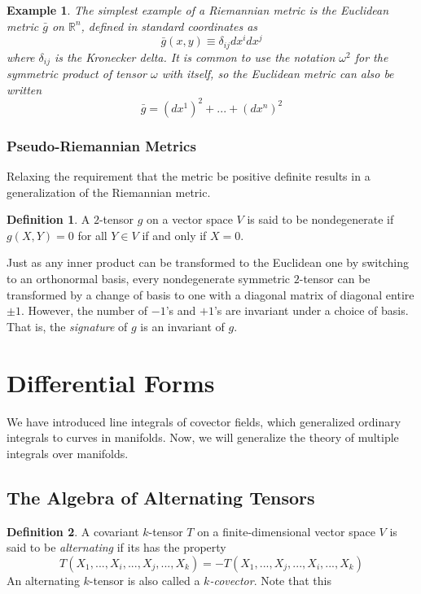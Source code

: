\documentclass{article}
\newtheorem{example}{Example}[section]
\theoremstyle{remark}
\theoremstyle{definition}
\newtheorem{definition}{Definition}[section]
\begin{document}
    \begin{example}
    The simplest example of a Riemannian metric is the \textit{Euclidean metric} $\bar{g}$ on $\mathbb{R}^n$, defined in standard coordinates as 
    \[\bar{g}(x, y) \equiv \delta_{ij} dx^i dx^j\]
    where $\delta_{ij}$ is the Kronecker delta. It is common to use the notation $\omega^2$ for the symmetric product of tensor $\omega$ with itself, so the Euclidean metric can also be written 
    \[\bar{g} = (dx^1)^2 + ... + (dx^n)^2\]
    \end{example}

    \subsubsection{Pseudo-Riemannian Metrics}
      Relaxing the requirement that the metric be positive definite results in a generalization of the Riemannian  metric. 

      \begin{definition}
      A $2$-tensor $g$ on a vector space $V$ is said to be nondegenerate if $g(X, Y) = 0$ for all $Y \in V$ if and only if $X = 0$. 
      \end{definition}

      Just as any inner product can be transformed to the Euclidean one by switching to an orthonormal basis, every nondegenerate  symmetric $2$-tensor can be transformed by a change of basis to one with a diagonal matrix of diagonal entire $\pm 1$. However, the number of $-1$'s and $+1$'s are invariant under a choice of basis. That is, the \textit{signature} of $g$ is an invariant of $g$. 

\section{Differential Forms}

  We have introduced line integrals of covector fields, which generalized ordinary integrals to curves in manifolds. Now, we will generalize the theory of multiple integrals over manifolds. 

  \subsection{The Algebra of Alternating Tensors}

    \begin{definition}
    A covariant $k$-tensor $T$ on a finite-dimensional vector space $V$ is said to be \textit{alternating} if its has the property
    \[T(X_1, ..., X_i, ..., X_j, ..., X_k) = - T(X_1, ..., X_j, ..., X_i, ..., X_k)\]
    An alternating $k$-tensor is also called a \textit{$k$-covector}. Note that this 
    \end{definition}
\end{document}
